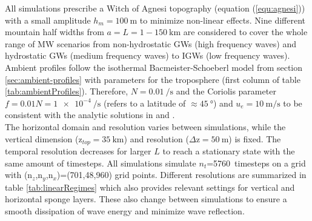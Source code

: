 All simulations prescribe a Witch of Agnesi topography (equation (\ref{equ:agnesi})) with a small amplitude $h_m = \SI{100}{\meter}$ to minimize non-linear effects. Nine different mountain half widths from $a = L = 1-\SI{150}{\kilo\meter}$ are considered to cover the whole range of MW scenarios from non-hydrostatic GWs (high frequency waves) and hydrostatic GWs (medium frequency waves) to IGWs (low frequency waves). Ambient profiles follow the isothermal Bacmeister-Schoeberl model from section \ref{sec:ambient-profiles} with parameters for the troposphere (first column of table \ref{tab:ambientProfiles}). Therefore, $N=\SI{0.01}{\per\second}$ and the Coriolis parameter $f = 0.01N = \SI{1e-4}{\per\second}$ (refers to a latitude of $\approx \SI{45}{\degree}$) and $u_e =\SI{10}{\meter\per\second}$ to be consistent with the analytic solutions in \textcite[]{queney_problem_1948} and \textcite[]{gill_atmosphere-ocean_1982}. \\
The horizontal domain and resolution varies between simulations, while the vertical dimension (z$_{top}=\SI{35}{\kilo\meter}$) and resolution ($\Delta$z$=\SI{50}{\meter}$) is fixed. The temporal resolution decreases for larger $L$ to reach a stationary state with the same amount of timesteps. All simulations simulate $n_t$=\SI{5760}{timesteps} on a grid with (n$_z$,n$_y$,n$_x$)=(701,48,960) grid points. Different resolutions are summarized in table \ref{tab:linearRegimes} which also provides relevant settings for vertical and horizontal sponge layers. These also change between simulations to ensure a smooth dissipation of wave energy and minimize wave reflection. \\
%
